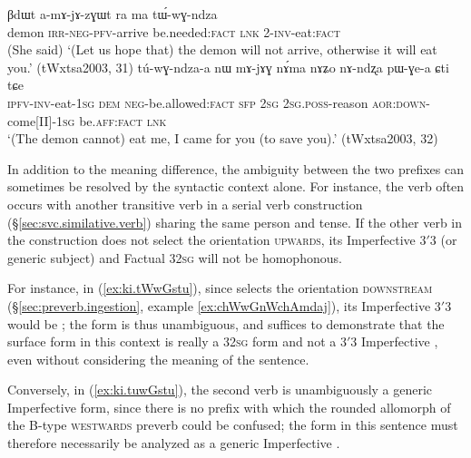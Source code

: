 \begin{exe}
	\ex   \label{ex:tuwGndza.ambiguity}
	\begin{xlist}
		\ex   \label{ex:ma.tWwGndza}
		\gll βdɯt a-mɤ-jɤ-zɣɯt ra ma tɯ́-wɣ-ndza  \\
		demon \textsc{irr}-\textsc{neg}-\textsc{pfv}-arrive be.needed:\textsc{fact} \textsc{lnk} 2-\textsc{inv}-eat:\textsc{fact}  \\
		\glt (She said) `(Let us hope that) the demon will not arrive, otherwise it will eat you.' (tWxtsa2003, 31)
		\ex   \label{ex:tuwGndzaa.mAjAG}
		\gll tú-wɣ-ndza-a nɯ mɤ-jɤɣ nɤ́ma nɤʑo nɤ-ndʐa pɯ-ɣe-a ɕti tɕe \\ 
		\textsc{ipfv}-\textsc{inv}-eat-\textsc{1sg} \textsc{dem} \textsc{neg}-be.allowed:\textsc{fact} \textsc{sfp} \textsc{2sg} \textsc{2sg}.\textsc{poss}-reason \textsc{aor}:\textsc{down}-come[II]-\textsc{1sg} be.\textsc{aff}:\textsc{fact} \textsc{lnk} \\
		\glt `(The demon cannot) eat me, I came for you (to save you).' (tWxtsa2003, 32)
	\end{xlist}
\end{exe}

In addition to the meaning difference, the ambiguity between the two prefixes can sometimes be resolved by the syntactic context alone. For instance, the verb  often occurs with another transitive verb in a serial verb construction (§\ref{sec:svc.similative.verb}) sharing the same person and tense. If the other verb in the construction does not select the orientation \textsc{upwards}, its Imperfective 3$'$\fl{}3 (or generic subject) and Factual 3\fl{}2\textsc{sg} will not be homophonous. 

For instance, in (\ref{ex:ki.tWwGstu}), since  selects the orientation \textsc{downstream} (§\ref{sec:preverb.ingestion}, example \ref{ex:chWwGnWchAmdaj}), its Imperfective 3$'$\fl{}3 would be ; the form  is thus unambiguous, and suffices to demonstrate that the surface form  in this context is really a 3\fl{}2\textsc{sg} form  and not a 3$'$\fl{}3 Imperfective , even without considering the meaning of the sentence.

Conversely, in (\ref{ex:ki.tuwGstu}), the second verb  is unambiguously a generic Imperfective form, since there is no prefix with which the rounded allomorph of the B-type \textsc{westwards} preverb  could be confused; the form  in this sentence must therefore necessarily be analyzed as a generic Imperfective .

